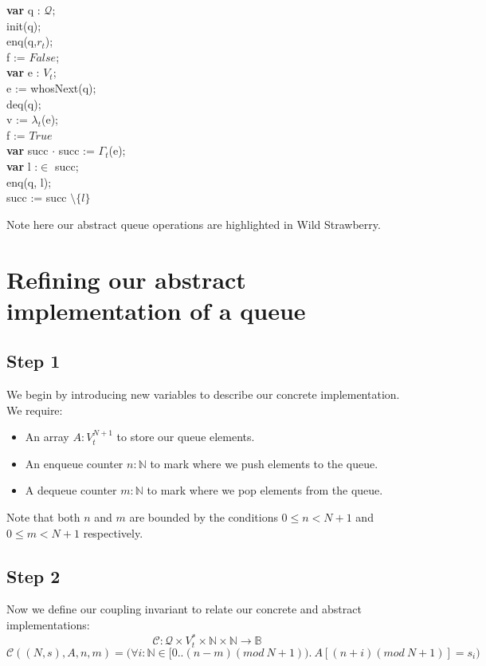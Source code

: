 \documentclass[a4paper]{scrartcl}
\newcommand{\N}{\mathbb{N}}
\newcommand{\C}{\mathcal{C}}
\newcommand{\Q}{\mathcal{Q}}
\newcommand{\ab}[1]{\textcolor{WildStrawberry}{#1}}
\begin{document}
{\begin{algorithm}[H]
\textbf{var} q : $\mathcal{Q};$ \\
\ab{init(q)}; \\
\ab{enq(q,$r_t$)}; \\
f := $False$; \\
\While {$\neg( f \lor \ab{isEmpty(q)})$} {
	\textbf{var} e : $V_t$; \\
	\ab{e := whosNext(q)}; \\
	\ab{deq(q)}; \\
	 {
		v := $\lambda_t$(e); \\
		f := $True$ \\
	} {
		\textbf{var} succ $\cdot$ succ := $\Gamma_t$(e); \\
		 {
			\textbf{var} l :$\in$ succ; \\
			\ab{enq(q, l)}; \\
			succ := succ $\setminus \{l\}$ \\
		}
	}
}
\end{algorithm}
%
Note here our \ab{abstract} queue operations are highlighted in \ab{Wild Strawberry}.
%
%
%
%
\section{Refining our abstract implementation of a queue}
%
\subsection{Step 1}
%
We begin by introducing new variables to describe our concrete implementation. We require: \\
%
\begin{itemize}
\item An array $A : V_t^{N+1}$ to store our queue elements.
\item An enqueue counter $n : \N$ to mark where we push elements to the queue.
\item A dequeue counter $m : \N$ to mark where we pop elements from the queue.
\end{itemize}
%
Note that both $n$ and $m$ are bounded by the conditions $0 \leq n < N + 1$ and $0 \leq m < N + 1$ respectively.
%
\subsection{Step 2}
%
Now we define our coupling invariant to relate our concrete and abstract implementations:
%
 \[ \C : \Q \times V_t^* \times \N \times \N \to \mathbb{B} \]
 \[ \C((N, s), A, n, m) = \Big( \forall i : \N \in \Big[0..(n - m)(mod ~N + 1)\Big). ~A[(n + i)(mod ~N + 1)] = s_i\Big) \]
%
%
}
\end{document}
